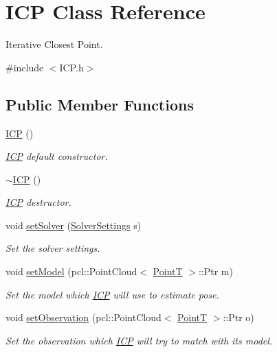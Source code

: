 \hypertarget{classICP}{\section{\-I\-C\-P \-Class \-Reference}
\label{classICP}
}


\-Iterative \-Closest \-Point.  




{\ttfamily \#include $<$\-I\-C\-P.\-h$>$}

\subsection*{\-Public \-Member \-Functions}
\begin{DoxyCompactItemize}
\item 
\hyperlink{classICP_a6a6f021c394b70387f0163239a74f94b}{\-I\-C\-P} ()
\begin{DoxyCompactList}\small\item\em \hyperlink{classICP}{\-I\-C\-P} default constructor. \end{DoxyCompactList}\item 
\hyperlink{classICP_a744eea059d43f0794b50d15ed056746a}{$\sim$\-I\-C\-P} ()
\begin{DoxyCompactList}\small\item\em \hyperlink{classICP}{\-I\-C\-P} destructor. \end{DoxyCompactList}\item 
void \hyperlink{classICP_a49b0a9fafd601c49f7cdd55edaa0f7a7}{set\-Solver} (\hyperlink{structSolverSettings}{\-Solver\-Settings} s)
\begin{DoxyCompactList}\small\item\em \-Set the solver settings. \end{DoxyCompactList}\item 
void \hyperlink{classICP_a7e02bf0f96bacf61fb7462c852be3c08}{set\-Model} (pcl\-::\-Point\-Cloud$<$ \hyperlink{common_8h_abd10555a534258e2739a38c928ef5db1}{\-Point\-T} $>$\-::\-Ptr m)
\begin{DoxyCompactList}\small\item\em \-Set the model which \hyperlink{classICP}{\-I\-C\-P} will use to estimate pose. \end{DoxyCompactList}\item 
void \hyperlink{classICP_a65d3a5293b19ec80f5f569abccd8b395}{set\-Observation} (pcl\-::\-Point\-Cloud$<$ \hyperlink{common_8h_abd10555a534258e2739a38c928ef5db1}{\-Point\-T} $>$\-::\-Ptr o)
\begin{DoxyCompactList}\small\item\em \-Set the observation which \hyperlink{classICP}{\-I\-C\-P} will try to match with its model. \end{DoxyCompactList}\item 

\end{DoxyCompactItemize}
